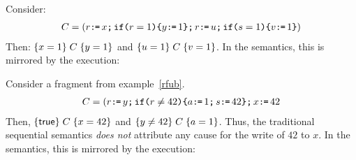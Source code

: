 \begin{example}
Consider:
\begin{align*}
C =   (r \texttt{:}\mkern-1mu\texttt{=}\, x \texttt{;}\, \texttt{if}\allowbreak\texttt{(}r=1\texttt{)} \allowbreak\texttt{\{} y \texttt{:}\mkern-1mu\texttt{=}\, 1 \texttt{\}} \texttt{;}\, r \texttt{:}\mkern-1mu\texttt{=}\, u \texttt{;}\, \texttt{if}\allowbreak\texttt{(}s=1\texttt{)} \allowbreak\texttt{\{} v \texttt{:}\mkern-1mu\texttt{=}\, 1 \texttt{\}})
\end{align*}
Then: $\{x=1\}\;C\;\{y=1\} $ and $\{u=1\}\;C\;\{v=1\} $.  In the semantics, this is mirrored by the execution:
\begin{tikzdisplay}[node distance=1em]
\end{tikzdisplay}
\end{example}

\begin{example}
Consider a fragment from example~\eqref{rfub}.
\begin{align*}
C = (r \texttt{:}\mkern-1mu\texttt{=}\, y \texttt{;}\, \texttt{if}\allowbreak\texttt{(}r \neq 42\texttt{)} \allowbreak\texttt{\{} a \texttt{:}\mkern-1mu\texttt{=}\, 1 \texttt{;}\, s \texttt{:}\mkern-1mu\texttt{=}\, 42 \texttt{\}} \texttt{;}\, x \texttt{:}\mkern-1mu\texttt{=}\, 42
\end{align*}
Then, $\{\mathsf{true}\}\;C\;\{x=42\} $ and $\{y \neq 42\}\;C\;\{a= 1\} $.  Thus, the traditional sequential semantics {\em does not} attribute any cause for the write of $42$ to $x$.  
In the semantics, this is mirrored by the execution:
\begin{tikzdisplay}[node distance=1em]
\end{tikzdisplay}
\end{example}


\endinput 



